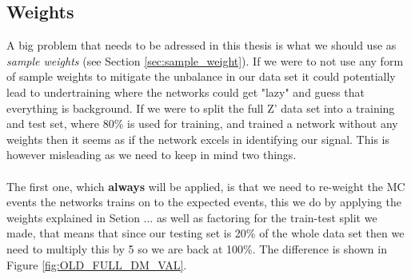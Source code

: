 \documentclass[14pt, a4paper]{book}
\begin{document}
\subsection{Weights}\label{sec:wgts}
\graphicspath{{../../figures/}}
A big problem that needs to be adressed in this thesis is what we should use as \textit{sample weights} (see Section \ref{sec:sample_weight}). If we were to not use any form of sample weights to mitigate the unbalance in our data set 
it could potentially lead to undertraining where the networks could get "lazy" and guess that everything is background. If we were to split the full Z' data set into a training and test set, where 80\% is used for training, and trained a network without any weights then it seems as if the network excels in identifying our signal. 
This is however misleading as we need to keep in mind two things.\\
\\The first one, which \textbf{always} will be applied, is that we need to re-weight the MC events the networks trains on to the expected events, this we do by applying the weights explained in Setion ... as well as factoring for the train-test split we made, 
that means that since our testing set is 20\% of the whole data set then we need to multiply this by 5 so we are back at 100\%. The difference is shown in Figure \ref{fig:OLD_FULL_DM_VAL}.\\ 
\end{document}
